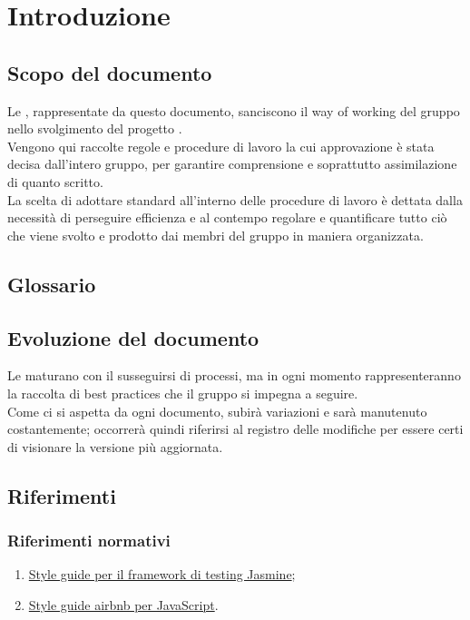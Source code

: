 \section{Introduzione} \label{section:introduzione}
\subsection{Scopo del documento}
Le \docNameNdP{}, rappresentate da questo documento, sanciscono il way of working del gruppo \groupName{} nello svolgimento del progetto \projectName{}.\\
Vengono qui raccolte regole e procedure di lavoro la cui approvazione è stata decisa dall'intero gruppo, per garantire comprensione e soprattutto assimilazione di quanto scritto.\\
La scelta di adottare standard all'interno delle procedure di lavoro è dettata dalla necessità di perseguire efficienza e al contempo regolare e quantificare tutto ciò che viene svolto e prodotto dai membri del gruppo in maniera organizzata.\\

\subsection{Glossario}
\gloDesc{}

\subsection{Evoluzione del documento}
Le \docNameNdP{} maturano con il susseguirsi di processi, ma in ogni momento rappresenteranno la raccolta di best practices che il gruppo \groupName{} si impegna a seguire.\\
Come ci si aspetta da ogni documento, subirà variazioni e sarà manutenuto costantemente; occorrerà quindi riferirsi al registro delle modifiche per essere certi di visionare la versione più aggiornata.

\subsection{Riferimenti}

\subsubsection{Riferimenti normativi}
\begin{enumerate}
	\item \href{https://github.com/CareMessagePlatform/jasmine-styleguide}{Style guide per il framework di testing Jasmine};
	\item \href{https://github.com/airbnb/javascript}{Style guide airbnb per JavaScript}.
\end{enumerate}

